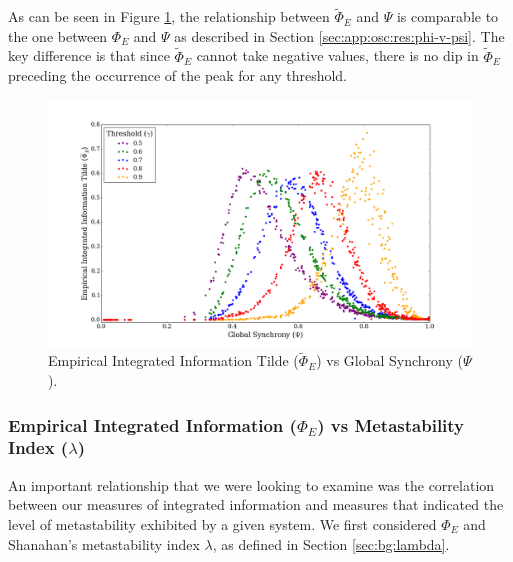 \documentclass[a4paper,11pt]{article}
\begin{document}
As can be seen in Figure \ref{fig:phi-tilde-vs-psi-multi}, the relationship between $\widetilde{\Phi}_{E}$ and $\Psi$ is comparable to the one between $\Phi_E$ and $\Psi$ as described in Section \ref{sec:app:osc:res:phi-v-psi}. The key difference is that since $\widetilde{\Phi}_{E}$ cannot take negative values, there is no dip in $\widetilde{\Phi}_{E}$ preceding the occurrence of the peak for any threshold.

\begin{figure}[H]
\begin{center}
\includegraphics[scale = 0.35]{figures/phi_tilde_vs_psi_multi}
\caption{
	Empirical Integrated Information Tilde ($\widetilde{\Phi}_E$) vs Global Synchrony ($\Psi$).
	\label{fig:phi-tilde-vs-psi-multi}
}
\end{center}
\end{figure}

\subsubsection{Empirical Integrated Information ($\Phi_{E}$) vs Metastability Index ($\lambda$)}
\label{sec:app:osc:res:phi-v-lambda}

An important relationship that we were looking to examine was the correlation between our measures of integrated information and measures that indicated the level of metastability exhibited by a given system. We first considered $\Phi_{E}$ and Shanahan's metastability index $\lambda$, as defined in Section \ref{sec:bg:lambda}.
\end{document}

